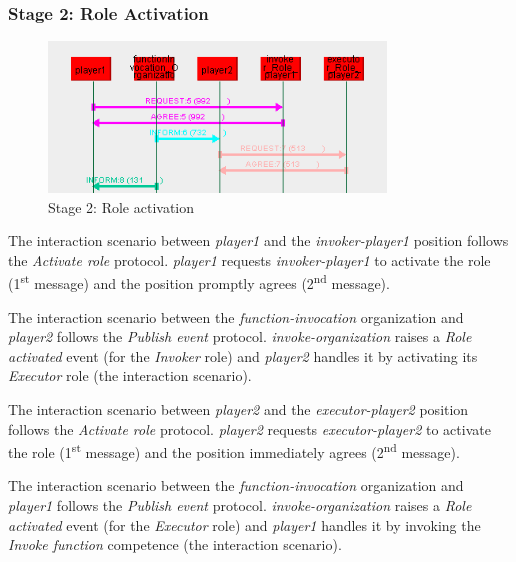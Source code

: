 \subsubsection*{Stage 2: Role Activation}

\begin{figure}[H]
	\centering
	\includegraphics[width=0.8\textwidth]{images/examples/example1-stage2.png}
	\caption{Stage 2: Role activation}
	\label{figure:example1-stage2}
\end{figure}

The {} interaction scenario between \textit{player1} and the \textit{invoker-player1} position follows the \textit{Activate role} protocol.
\textit{player1} requests \textit{invoker-player1} to activate the role (1\textsuperscript{st} message) and the position promptly agrees (2\textsuperscript{nd} message).

The {} interaction scenario between the \textit{function-invocation} organization and \textit{player2} follows the \textit{Publish event} protocol.
\textit{invoke-organization} raises a \textit{Role activated} event (for the \textit{Invoker} role) and \textit{player2} handles it by activating its \textit{Executor} role (the {} interaction scenario).

The {} interaction scenario between \textit{player2} and the \textit{executor-player2} position follows the \textit{Activate role} protocol.
\textit{player2} requests \textit{executor-player2} to activate the role (1\textsuperscript{st} message) and the position immediately agrees (2\textsuperscript{nd} message).

The {} interaction scenario between the \textit{function-invocation} organization and \textit{player1} follows the \textit{Publish event} protocol.
\textit{invoke-organization} raises a \textit{Role activated} event (for the \textit{Executor} role) and \textit{player1} handles it by invoking the \textit{Invoke function} competence (the {} interaction scenario).

